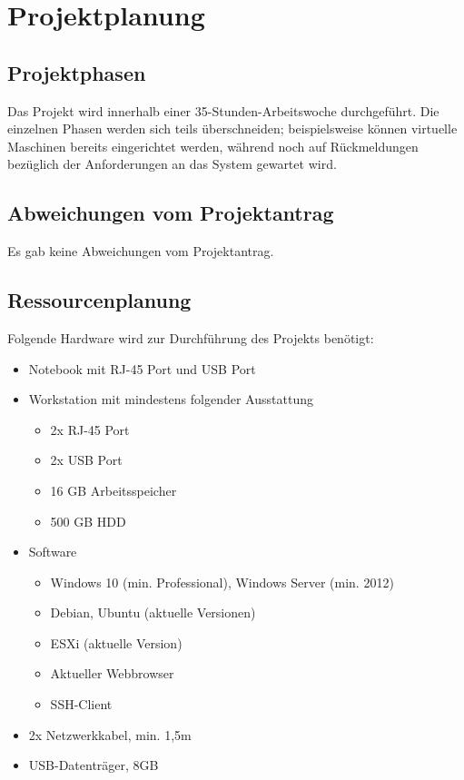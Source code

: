 \section{Projektplanung} 
\label{sec:Projektplanung}

\subsection{Projektphasen}
\label{sec:Projektphasen}
Das Projekt wird innerhalb einer 35-Stunden-Arbeitswoche durchgeführt. Die einzelnen Phasen werden sich teils überschneiden; beispielsweise können virtuelle Maschinen bereits eingerichtet werden, während noch auf Rückmeldungen bezüglich der Anforderungen an das System gewartet wird. 

\subsection{Abweichungen vom Projektantrag}
\label{sec:AbweichungenProjektantrag}
Es gab keine Abweichungen vom Projektantrag.

\subsection{Ressourcenplanung}
\label{sec:Ressourcenplanung}
Folgende Hardware wird zur Durchführung des Projekts benötigt:
\begin{itemize}
  \item Notebook mit RJ-45 Port und USB Port
  \item Workstation mit mindestens folgender Ausstattung
  \begin{itemize}
    \item 2x RJ-45 Port
    \item 2x USB Port
    \item 16 GB Arbeitsspeicher
    \item 500 GB HDD
  \end{itemize}
  \item Software
  \begin{itemize}
    \item Windows 10 (min. Professional), Windows Server (min. 2012)
    \item Debian, Ubuntu (aktuelle Versionen)
    \item ESXi (aktuelle Version)
    \item Aktueller Webbrowser
    \item SSH-Client
  \end{itemize}
  \item 2x Netzwerkkabel, min. 1,5m
  \item USB-Datenträger, 8GB
\end{itemize}